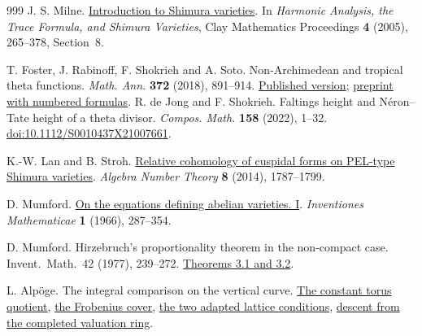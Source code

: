\documentclass[11pt]{article}
\theoremstyle{definition}
\theoremstyle{plain}
\begin{document}
\begin{thebibliography}{999}
 J. S. Milne.
\href{https://www.jmilne.org/math/xnotes/svi.pdf}{Introduction to Shimura varieties}.
In \emph{Harmonic Analysis, the Trace Formula, and Shimura Varieties},
Clay Mathematics Proceedings \textbf{4} (2005), 265--378, Section~8.

 T. Foster, J. Rabinoff, F. Shokrieh
and A. Soto. Non-Archimedean and tropical theta functions.
\emph{Math. Ann.} \textbf{372} (2018), 891--914.
\href{https://doi.org/10.1007/s00208-018-1646-3}{Published version};
\href{https://arxiv.org/abs/1705.08212v2}{preprint with numbered formulas}.
 R. de Jong and F. Shokrieh.
Faltings height and N\'eron--Tate height of a theta divisor.
\emph{Compos. Math.} \textbf{158} (2022), 1--32.
\href{https://doi.org/10.1112/S0010437X21007661}{doi:10.1112/S0010437X21007661}.

 K.-W. Lan and B. Stroh.
\href{https://doi.org/10.2140/ant.2014.8.1787}{Relative cohomology of cuspidal forms on PEL-type Shimura varieties}.
\emph{Algebra Number Theory} \textbf{8} (2014), 1787--1799.

 D. Mumford.
\href{https://doi.org/10.1007/BF01389737}{On the equations defining abelian varieties. I}.
\emph{Inventiones Mathematicae} \textbf{1} (1966), 287--354.

 D. Mumford. Hirzebruch's proportionality
theorem in the non-compact case. Invent.\ Math.\ 42 (1977), 239--272.
\href{https://doi.org/10.1007/BF01389790}{Theorems 3.1 and 3.2}.

 L. Alp\"oge. The integral comparison on the vertical curve.
\href{https://github.com/TomasOrtega/RH/blob/a6ac91a412dcbaab31801355ec5707024a71bf65/extracted/lean/src/Development/AbelianVarietyTheory/Proofs/DivisorProofs/ExistsCoverSemiabelianPolarization.lean}{The constant torus quotient},
\href{https://github.com/TomasOrtega/RH/blob/a6ac91a412dcbaab31801355ec5707024a71bf65/extracted/lean/src/Development/AbelianVarietyTheory/Proofs/DivisorProofs/FrobeniusPullbackAbelianGeneric.lean}{the Frobenius cover},
\href{https://github.com/TomasOrtega/RH/blob/a6ac91a412dcbaab31801355ec5707024a71bf65/extracted/lean/src/Development/AbelianVarietyTheory/Proofs/DivisorProofs/AbelianGenericIsogenyExtension.lean}{the two adapted lattice conditions},
\href{https://github.com/TomasOrtega/RH/blob/a6ac91a412dcbaab31801355ec5707024a71bf65/extracted/lean/src/Development/AbelianVarietyTheory/Proofs/DivisorProofs/LatticeExtensionCompleteToDvr.lean}{descent from the completed valuation ring}.


\end{thebibliography}
\end{document}
